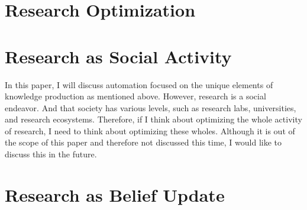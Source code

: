 \documentclass{article}
\begin{document}
\section{Research Optimization}

\section{Research as Social Activity}
In this paper, I will discuss automation focused on the unique elements of knowledge production as mentioned above. However, research is a social endeavor. And that society has various levels, such as research labs, universities, and research ecosystems. Therefore, if I think about optimizing the whole activity of research, I need to think about optimizing these wholes. Although it is out of the scope of this paper and therefore not discussed this time, I would like to discuss this in the future.

\section{Research as Belief Update}
\end{document}
